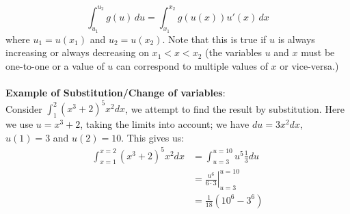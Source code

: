 \documentclass{report}
\begin{document}
\begin{equation*}
\int_{u_1}^{u_2}g(u)\,du=\int_{x_1}^{x_2}g(u(x))u'(x)\,dx
\end{equation*}
where $u_1=u(x_1)$ and $u_2=u(x_2)$. Note that this is true if $u$ is always increasing 
or always decreasing on $x_1<x<x_2$ (the variables $u$ and $x$ must be one-to-one 
or a value of $u$ can correspond to multiple values of $x$ or vice-versa.)\\
\vspace{1mm}\\
\textbf{Example of Substitution/Change of variables}:\\
Consider $\int_1^2(x^3+2)^5x^2dx$, we attempt to find the result by substitution. 
Here we use $u=x^3+2$, taking the limits into account; 
we have $du=3x^2dx$, $u(1)=3$ and $u(2)=10$. This gives us:
\begin{align*}
\int_{x=1}^{x=2}(x^3+2)^5x^2dx
&=\int_{u=3}^{u=10}u^5\frac{1}{3}du\\
&=\left.\frac{u^6}{6\cdot3}\right|_{u=3}^{u=10}\\
&=\frac{1}{18}(10^6-3^6)
\end{align*}
\newpage
\end{document}
